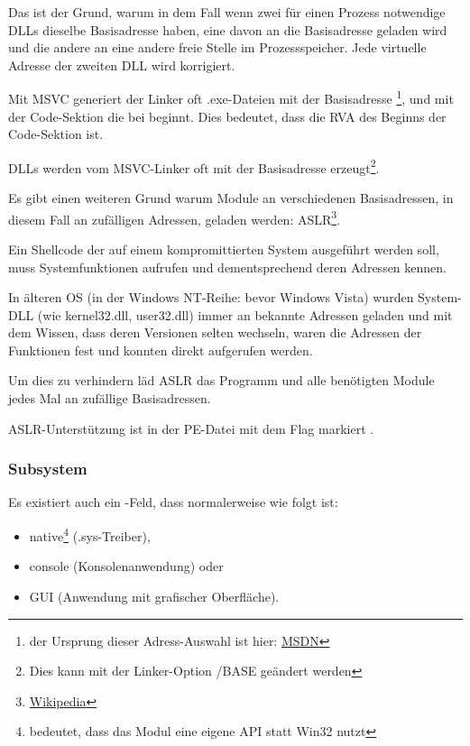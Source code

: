 Das ist der Grund, warum in dem Fall wenn zwei für einen Prozess notwendige DLLs
dieselbe Basisadresse haben, eine davon an die Basisadresse geladen wird und die
andere an eine andere freie Stelle im Prozessspeicher. Jede virtuelle Adresse der
zweiten DLL wird korrigiert.

\par Mit \ac{MSVC} generiert der Linker oft .exe-Dateien mit der Basisadresse
\footnote{der Ursprung dieser Adress-Auswahl ist hier: \href{http://go.yurichev.com/17041}{MSDN}},
und mit der Code-Sektion die bei  beginnt.
Dies bedeutet, dass die \ac{RVA} des Beginns der Code-Sektion  ist.

DLLs werden vom MSVC-Linker oft mit der Basisadresse 
erzeugt\footnote{Dies kann mit der Linker-Option /BASE geändert werden}.


Es gibt einen weiteren Grund warum Module an verschiedenen Basisadressen, in diesem
Fall an zufälligen Adressen, geladen werden: \ac{ASLR}\footnote{\href{http://go.yurichev.com/17140}{Wikipedia}}.


Ein Shellcode der auf einem kompromittierten System ausgeführt werden soll, muss
Systemfunktionen aufrufen und dementsprechend deren Adressen kennen.

In älteren \ac{OS} (in der \gls{Windows NT}-Reihe: bevor Windows Vista) wurden
System-DLL (wie kernel32.dll, user32.dll) immer an bekannte Adressen geladen und
mit dem Wissen, dass deren Versionen selten wechseln, waren die Adressen der Funktionen
fest und konnten direkt aufgerufen werden.

Um dies zu verhindern läd \ac{ASLR} das Programm und alle benötigten Module jedes
Mal an zufällige Basisadressen.

\ac{ASLR}-Unterstützung ist in der PE-Datei mit dem Flag
 markiert .

\subsubsection{Subsystem}

Es existiert auch ein -Feld, dass normalerweise wie folgt ist:


\begin{itemize}
\item native\footnote{bedeutet, dass das Modul eine eigene API statt Win32 nutzt} (.sys-Treiber),

\item console (Konsolenanwendung) oder

\item \ac{GUI} (Anwendung mit grafischer Oberfläche).
\end{itemize}

